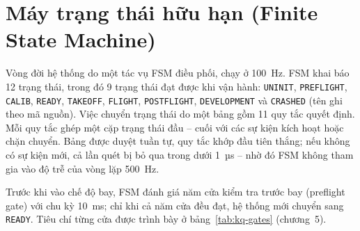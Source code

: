 \section{Máy trạng thái hữu hạn (Finite State Machine)}

Vòng đời hệ thống do một tác vụ FSM điều phối, chạy ở 100~Hz. FSM khai báo 12 trạng thái, trong đó 9 trạng thái đạt được khi vận hành: \texttt{UNINIT}, \texttt{PREFLIGHT}, \texttt{CALIB}, \texttt{READY}, \texttt{TAKEOFF}, \texttt{FLIGHT}, \texttt{POSTFLIGHT}, \texttt{DEVELOPMENT} và \texttt{CRASHED} (tên ghi theo mã nguồn). Việc chuyển trạng thái do một bảng gồm 11 quy tắc quyết định. Mỗi quy tắc ghép một cặp trạng thái đầu -- cuối với các sự kiện kích hoạt hoặc chặn chuyển. Bảng được duyệt tuần tự, quy tắc khớp đầu tiên thắng; nếu không có sự kiện mới, cả lần quét bị bỏ qua trong dưới 1~µs -- nhờ đó FSM không tham gia vào độ trễ của vòng lặp 500~Hz.

Trước khi vào chế độ bay, FSM đánh giá năm cửa kiểm tra trước bay (preflight gate) với chu kỳ 10~ms; chỉ khi cả năm cửa đều đạt, hệ thống mới chuyển sang \texttt{READY}. Tiêu chí từng cửa được trình bày ở bảng~\ref{tab:kq-gates} (chương~5).
